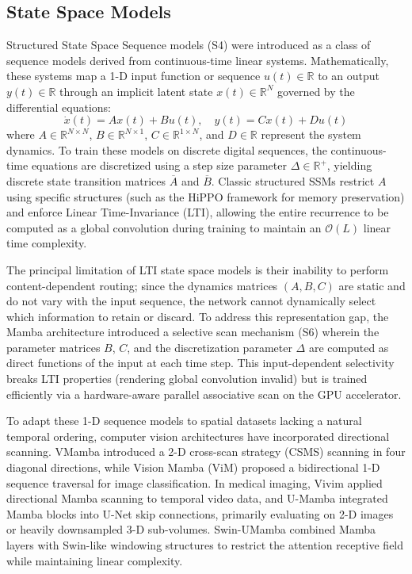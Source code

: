 \documentclass[pdflatex,sn-mathphys-num]{sn-jnl}
\begin{document}
\subsection{State Space Models}\label{ssec:ssm}
Structured State Space Sequence models (S4) \citep{gu2021efficiently} were introduced as a class of sequence models derived from continuous-time linear systems. Mathematically, these systems map a 1-D input function or sequence $u(t) \in \mathbb{R}$ to an output $y(t) \in \mathbb{R}$ through an implicit latent state $x(t) \in \mathbb{R}^N$ governed by the differential equations:
\begin{equation}
\dot{x}(t) = A x(t) + B u(t), \quad y(t) = C x(t) + D u(t)
\end{equation}
where $A \in \mathbb{R}^{N \times N}$, $B \in \mathbb{R}^{N \times 1}$, $C \in \mathbb{R}^{1 \times N}$, and $D \in \mathbb{R}$ represent the system dynamics. To train these models on discrete digital sequences, the continuous-time equations are discretized using a step size parameter $\Delta \in \mathbb{R}^+$, yielding discrete state transition matrices $\overline{A}$ and $\overline{B}$. Classic structured SSMs restrict $A$ using specific structures (such as the HiPPO framework for memory preservation) and enforce Linear Time-Invariance (LTI), allowing the entire recurrence to be computed as a global convolution during training to maintain an $\mathcal{O}(L)$ linear time complexity. 

The principal limitation of LTI state space models is their inability to perform content-dependent routing; since the dynamics matrices $(A, B, C)$ are static and do not vary with the input sequence, the network cannot dynamically select which information to retain or discard. To address this representation gap, the Mamba architecture \citep{gu2023mamba} introduced a selective scan mechanism (S6) wherein the parameter matrices $B$, $C$, and the discretization parameter $\Delta$ are computed as direct functions of the input at each time step. This input-dependent selectivity breaks LTI properties (rendering global convolution invalid) but is trained efficiently via a hardware-aware parallel associative scan on the GPU accelerator.

To adapt these 1-D sequence models to spatial datasets lacking a natural temporal ordering, computer vision architectures have incorporated directional scanning. VMamba \citep{liu2024vmamba} introduced a 2-D cross-scan strategy (CSMS) scanning in four diagonal directions, while Vision Mamba (ViM) \citep{zhu2024vision} proposed a bidirectional 1-D sequence traversal for image classification. In medical imaging, Vivim \citep{yang2024vivim} applied directional Mamba scanning to temporal video data, and U-Mamba \citep{ma2024u} integrated Mamba blocks into U-Net skip connections, primarily evaluating on 2-D images or heavily downsampled 3-D sub-volumes. Swin-UMamba \citep{wang2024swinumamba} combined Mamba layers with Swin-like windowing structures to restrict the attention receptive field while maintaining linear complexity.
\end{document}
